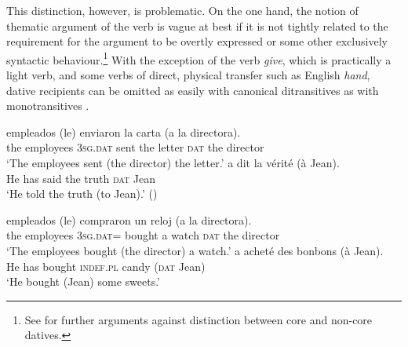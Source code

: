 \documentclass[output=paper,colorlinks,citecolor=brown,nonflat]{./langscibook}
\begin{document}
This distinction, however, is problematic. On the one hand, the notion of thematic argument of the verb is vague at best if it is not tightly related to the requirement for the argument to be overtly expressed or some other exclusively syntactic behaviour.\footnote{See \citet{FernándezAlcalde2014} for further arguments against  distinction between core and non-core datives.}  With the exception of the verb \textit{give}, which is practically a light verb, and some verbs of direct, physical transfer such as English \textit{hand}, dative recipients can be omitted as easily with canonical ditransitives  as with monotransitives .

\ea%
    \label{ex:cuervo:1}
    \ea%
        \label{ex:cuervo:1a}
         {empleados} {(le)}  {enviaron}  {la} {carta} {(a} {la} {directora).}\\
             the employees {3\textsc{sg.dat}} sent        the letter \textsc{dat} the director\\
        \glt ‘The employees sent (the director) the letter.’
    \ex%
        \label{ex:cuervo:1b}
         {a} {dit} {la} {vérité} {(à} {Jean)}.\\
        He has said the truth \textsc{dat} Jean\\
        \glt ‘He told the truth (to Jean).’  (\citealt{BonehNash2012})
    \z
\z



\ea%
    \label{ex:cuervo:2}
    \ea%
        \label{ex:cuervo:2a}
         {empleados} {(le)} {compraron} {un} {reloj} {(a} {la} {directora)}.\\
                   the employees {\textsc{3sg.dat}=} bought a watch \textsc{dat} the director\\
        \glt ‘The employees bought (the director) a watch.’
    \ex%
        \label{ex:cuervo:2b}
         {a} {acheté} {des} {bonbons} {(à} {Jean)}.\\
        He has bought {\textsc{indef.pl}} candy (\textsc{dat} Jean)\\
        \glt ‘He bought (Jean) some sweets.’
    \z
\z
\end{document}
